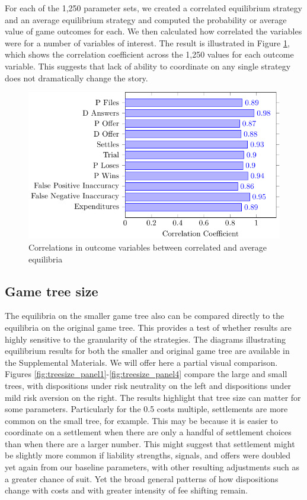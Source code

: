 \documentclass{article}
\begin{document}
For each of the 1,250 parameter sets, we created a correlated equilibrium strategy and an average equilibrium strategy and computed the probability or average value of game outcomes for each. We then calculated how correlated the variables were for a number of variables of interest. The result is illustrated in Figure \ref{fig:correlations_corrvsave}, which shows the correlation coefficient across the 1,250 values for each outcome variable. This suggests that lack of ability to coordinate on any single strategy does not dramatically change the story.  

\begin{figure}[h!]
\centering
\includegraphics[scale=0.5, trim={0in 0in 0in 0in}, clip]{../Figures/Correlation between correlated and average equilibrium.pdf}
\caption{Correlations in outcome variables between correlated and average equilibria}
\label{fig:correlations_corrvsave}
\end{figure}

\subsection{Game tree size}

The equilibria on the smaller game tree also can be compared directly to the equilibria on the original game tree. This provides a test of whether results are highly sensitive to the granularity of the strategies. The diagrams illustrating equilibrium results for both the smaller and original game tree are available in the Supplemental Materials. We will offer here a partial visual comparison. Figures \ref{fig:treesize_panel1}-\ref{fig:treesize_panel4} compare the large and small trees, with dispositions under risk neutrality on the left and dispositions under mild risk aversion on the right. The results highlight that tree size can matter for some parameters. Particularly for the 0.5 costs multiple, settlements are more common on the small tree, for example. This may be because it is easier to coordinate on a settlement when there are only a handful of settlement choices than when there are a larger number. This might suggest that settlement might be slightly more common if liability strengths, signals, and offers were doubled yet again from our baseline parameters, with other resulting adjustments such as a greater chance of suit. Yet the broad general patterns of how dispositions change with costs and with greater intensity of fee shifting remain. 
\end{document}
